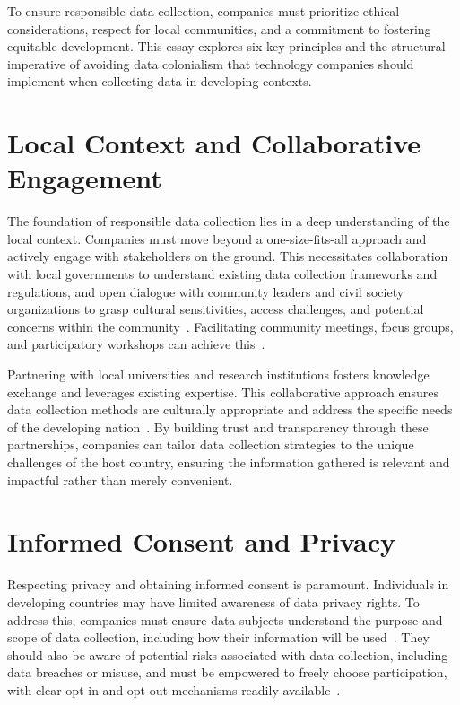 \documentclass[11pt,showkeys]{essay}
\begin{document}
To ensure responsible data collection, companies must prioritize ethical considerations, respect for local communities, and a commitment to fostering equitable development. This essay explores six key principles and the structural imperative of avoiding data colonialism that technology companies should implement when collecting data in developing contexts.

\section{Local Context and Collaborative Engagement}

The foundation of responsible data collection lies in a deep understanding of the local context. Companies must move beyond a one-size-fits-all approach and actively engage with stakeholders on the ground. This necessitates collaboration with local governments to understand existing data collection frameworks and regulations, and open dialogue with community leaders and civil society organizations to grasp cultural sensitivities, access challenges, and potential concerns within the community~\cite{runde_innovative_2022}. Facilitating community meetings, focus groups, and participatory workshops can achieve this~\cite{grimmelikhuijsen_explaining_2022}.

Partnering with local universities and research institutions fosters knowledge exchange and leverages existing expertise. This collaborative approach ensures data collection methods are culturally appropriate and address the specific needs of the developing nation~\cite{goldberg_world_2020}. By building trust and transparency through these partnerships, companies can tailor data collection strategies to the unique challenges of the host country, ensuring the information gathered is relevant and impactful rather than merely convenient.

\section{Informed Consent and Privacy}

Respecting privacy and obtaining informed consent is paramount. Individuals in developing countries may have limited awareness of data privacy rights. To address this, companies must ensure data subjects understand the purpose and scope of data collection, including how their information will be used~\cite{ohm_broken_2009}. They should also be aware of potential risks associated with data collection, including data breaches or misuse, and must be empowered to freely choose participation, with clear opt-in and opt-out mechanisms readily available~\cite{ohm_broken_2009}.
\end{document}
